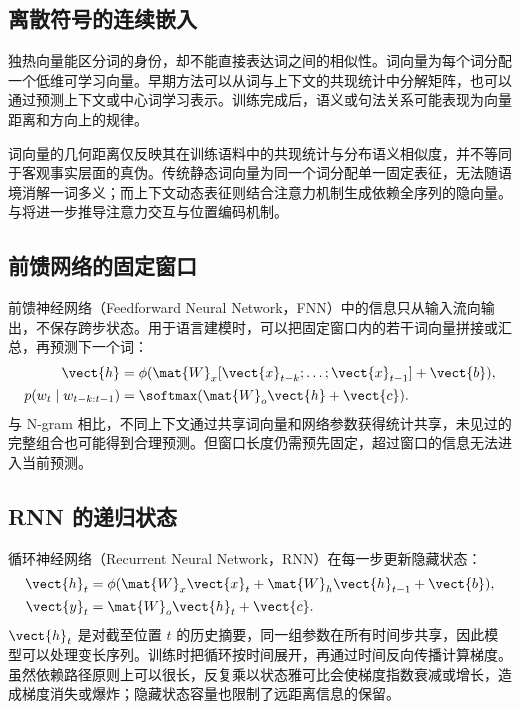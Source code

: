 \documentclass[../textbook.tex]{subfiles}
\begin{document}
\subsection{离散符号的连续嵌入}
独热向量能区分词的身份，却不能直接表达词之间的相似性。词向量为每个词分配一个低维可学习向量。早期方法可以从词与上下文的共现统计中分解矩阵，也可以通过预测上下文或中心词学习表示。训练完成后，语义或句法关系可能表现为向量距离和方向上的规律。

词向量的几何距离仅反映其在训练语料中的共现统计与分布语义相似度，并不等同于客观事实层面的真伪。传统静态词向量为同一个词分配单一固定表征，无法随语境消解一词多义；而上下文动态表征则结合注意力机制生成依赖全序列的隐向量。与将进一步推导注意力交互与位置编码机制。


\subsection{前馈网络的固定窗口}
前馈神经网络（Feedforward Neural Network，FNN）中的信息只从输入流向输出，不保存跨步状态。用于语言建模时，可以把固定窗口内的若干词向量拼接或汇总，再预测下一个词：
\begin{equation}
 \begin{aligned}
  \vect{h}&=\phi(\mat{W}_x[\vect{x}_{t-k};\ldots;\vect{x}_{t-1}]+\vect{b}),\\
  p(w_t\mid w_{t-k:t-1})&=\softmax(\mat{W}_o\vect{h}+\vect{c}).
 \end{aligned}
\end{equation}
与 N-gram 相比，不同上下文通过共享词向量和网络参数获得统计共享，未见过的完整组合也可能得到合理预测。但窗口长度仍需预先固定，超过窗口的信息无法进入当前预测。

\subsection{RNN 的递归状态}
循环神经网络（Recurrent Neural Network，RNN）在每一步更新隐藏状态：
\begin{equation}
 \begin{aligned}
  \vect{h}_t&=\phi(\mat{W}_x\vect{x}_t+\mat{W}_h\vect{h}_{t-1}+\vect{b}),\\
  \vect{y}_t&=\mat{W}_o\vect{h}_t+\vect{c}.
 \end{aligned}
\end{equation}
$\vect{h}_t$ 是对截至位置 $t$ 的历史摘要，同一组参数在所有时间步共享，因此模型可以处理变长序列。训练时把循环按时间展开，再通过时间反向传播计算梯度。虽然依赖路径原则上可以很长，反复乘以状态雅可比会使梯度指数衰减或增长，造成梯度消失或爆炸；隐藏状态容量也限制了远距离信息的保留。
\end{document}
